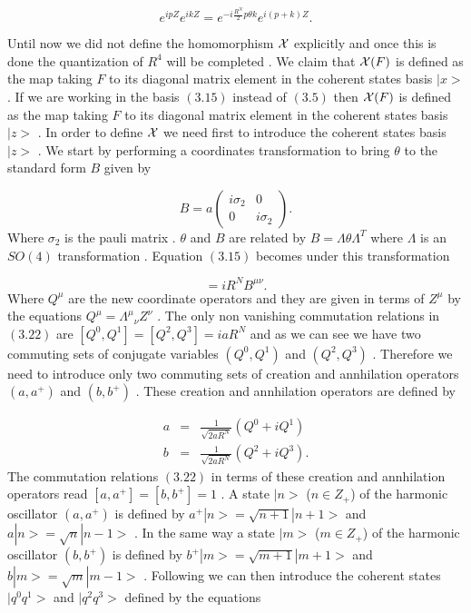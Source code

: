 \documentclass[a4paper,12pt]{article}
\begin{document}
\begin{equation}
e^{ipZ}e^{ikZ}=e^{-i\frac{R^N}{2}p{\theta}k}e^{i(p+k)Z}.
\end{equation}


 \vskip 5mm  \vskip 5mm
\noindent

Until now we did not define the homomorphism ${\cal X}$ explicitly
and once this is done the quantization of $R^4$ will be completed
. We claim that ${\cal X}(F)$ is defined as the map taking $F$ to
its diagonal matrix element in the coherent states basis $|x>$
\cite{peter,chms,cdp} . If we are working in the basis $(3.15)$ instead of
$(3.5)$ then ${\cal X}(F)$ is defined as the map taking $F$ to
its diagonal matrix element in the coherent states basis $|z>$ .
In order to define ${\cal X}$ we need first to introduce the
coherent states basis $|z>$ . We start by performing a
coordinates transformation to bring ${\theta}$ to the standard
form $B$ given by \cite{bars}

\begin{equation}
{B}=a\left( \begin{array}{cc}
                                      i{\sigma}_{2}  & 0\\
                                     0  & i{\sigma}_{2}
                                    \end{array}
                                     \right).
\end{equation}
Where ${\sigma}_2$ is the pauli matrix . ${\theta}$ and $B$ are
related by $B = {\Lambda} {\theta}{\Lambda}^{T}$ where
${\Lambda}$ is an $SO(4)$ transformation . Equation $(3.15)$
becomes under this transformation

\begin{equation}
[Q^{\mu},Q^{\nu}]=iR^NB^{{\mu}{\nu}}.
\end{equation}
Where $Q^{\mu}$ are the new coordinate operators and they are given in terms of $Z^{\mu}$ by the equations
 $ Q^{\mu}={{\Lambda}^{\mu}}_{\nu} Z^{\nu}$ . The only non vanishing commutation relations in $(3.22)$ are $[Q^{0},Q^{1}]=[Q^{2},Q^{3}]=iaR^N$
 and as we can see we have two commuting sets of conjugate variables $(Q^0,Q^1)$ and $(Q^2,Q^3)$ .
 Therefore we need to introduce only two commuting sets of creation and annhilation operators $(a,a^{+})$
and $(b,b^{+})$ . These creation and annhilation operators are defined by

\begin{eqnarray}
a&=&\frac{1}{\sqrt{2aR^N}}(Q^0+iQ^1)\nonumber\\
b&=&\frac{1}{\sqrt{2aR^N}}(Q^{2}+iQ^{3}).
\end{eqnarray}
The commutation relations $(3.22)$ in terms of these creation and
annhilation operators read $[a,a^{+}]=[b,b^{+}]=1$ . A state
$|n>$ ($n{\in}Z_{+}$) of the harmonic oscillator $(a,a^+)$ is
defined by $a^{+}|n>=\sqrt{n+1}|n+1>$ and $a|n>=\sqrt{n}|n-1>$ .
In the same way a state $|m>$ ($m{\in}Z_{+}$) of the harmonic
oscillator $(b,b^+)$ is defined by $b^{+}|m>=\sqrt{m+1}|m+1>$ and
$b|m>=\sqrt{m}|m-1>$ . Following \cite{klauder} we can then
introduce the coherent states $|q^0q^1>$ and $|q^2q^3>$ defined
by the equations
\end{document}
